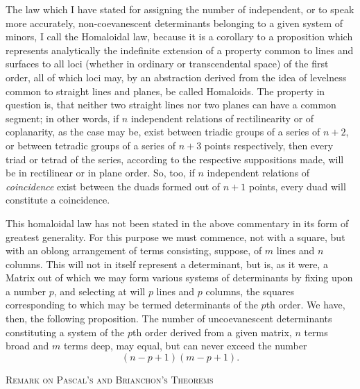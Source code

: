 \documentclass[11pt]{article}
\newcommand{\subpaperhead}[1]{\begin{center}{\large\scshape #1}\end{center}}
\begin{document}
{{The law which I have stated for assigning the number of independent, or to speak more accurately, non-coevanescent determinants belonging to a given system of minors, I call the Homaloidal law, because it is a corollary to a proposition which represents analytically the indefinite extension of a property common to lines and surfaces to all loci (whether in ordinary or transcendental space) of the first order, all of which loci may, by an abstraction derived from the idea of levelness common to straight lines and planes, be called Homaloids. The property in question is, that neither two straight lines nor two planes can have a common segment; in other words, if $n$ independent relations of rectilinearity or of coplanarity, as the case may be, exist between triadic groups of a series of $n+2$, or between tetradic groups of a series of $n+3$ points respectively, then every triad or tetrad of the series, according to the respective suppositions made, will be in rectilinear or in plane order. So, too, if $n$ independent relations of \emph{coincidence} exist between the duads formed out of $n+1$ points, every duad will constitute a coincidence.

This homaloidal law has not been stated in the above commentary in its form of greatest generality. For this purpose we must commence, not with a square, but with an oblong arrangement of terms consisting, suppose, of $m$ lines and $n$ columns. This will not in itself represent a determinant, but is, as it were, a Matrix out of which we may form various systems of determinants by fixing upon a number $p$, and selecting at will $p$ lines and $p$ columns, the squares corresponding to which may be termed determinants of the $p$th order. We have, then, the following proposition. The number of uncoevanescent determinants constituting a system of the $p$th order derived from a given matrix, $n$ terms broad and $m$ terms deep, may equal, but can never exceed the number
\[
(n-p+1)(m-p+1).
\]

\subpaperhead{Remark on Pascal's and Brianchon's Theorems}

}}
\end{document}
